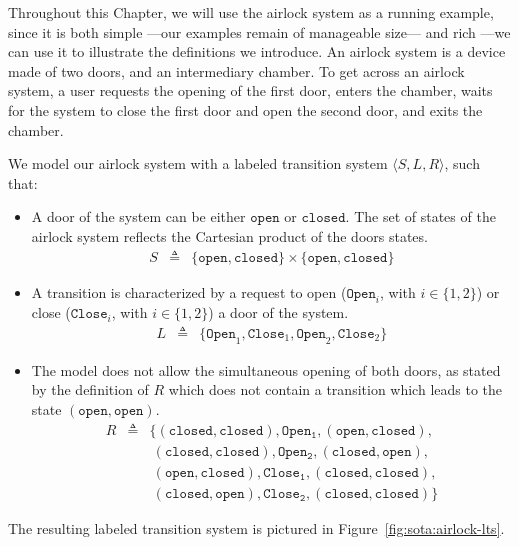 Throughout this Chapter, we will use the airlock system as a running example,
since it is both simple ---our examples remain of manageable size--- and rich
---we can use it to illustrate the definitions we introduce.
%
An airlock system is a device made of two doors, and an intermediary chamber.
%
To get across an airlock system, a user requests the opening of the first door,
enters the chamber, waits for the system to close the first door and open the
second door, and exits the chamber.

\begin{example}
  \label{example:sota:airlocklts}

  We model our airlock system with a labeled transition system
  \( \langle S, L, R \rangle \), such that:

  \begin{itemize}
  \item A door of the system can be either \( \mathtt{open} \) or
    \( \mathtt{closed} \).
    The set of states of the airlock system reflects the Cartesian product of
    the doors states.
    \[
      \begin{array}{rcl}
        S & \triangleq & \{ \mathtt{open}, \mathtt{closed} \} \times \{ \mathtt{open},
                         \mathtt{closed} \}
      \end{array}
    \]
  \item A transition is characterized by a request to open
    (\( \mathtt{Open}_i\), with \( i \in \{1, 2\} \)) or close
    (\( \mathtt{Close}_i \), with \( i \in \{1, 2\} \)) a door of the system.
    \[
      \begin{array}{rcl}
        L & \triangleq & \{ \mathtt{Open}_1, \mathtt{Close}_1, \mathtt{Open}_2,
                         \mathtt{Close}_2 \}
      \end{array}
    \]
  \item The model does not allow the simultaneous opening of both doors, as
    stated by the definition of \( R \) which does not contain a transition
    which leads to the state \( (\mathtt{open}, \mathtt{open}) \).
    \[
      \begin{array}{rcl}
        R & \triangleq & \{ (\mathtt{closed}, \mathtt{closed}), \mathtt{Open_1},
                         (\mathtt{open}, \mathtt{closed}), \\
          & & \ (\mathtt{closed}, \mathtt{closed}), \mathtt{Open_2},
              (\mathtt{closed}, \mathtt{open}), \\
          & & \ (\mathtt{open}, \mathtt{closed}), \mathtt{Close_1},
              (\mathtt{closed}, \mathtt{closed}), \\
          & & \ (\mathtt{closed}, \mathtt{open}), \mathtt{Close_2},
              (\mathtt{closed}, \mathtt{closed}) \}
      \end{array}
    \]
  \end{itemize}

  The resulting labeled transition system is pictured in
  Figure~\ref{fig:sota:airlock-lts}.
\end{example}

